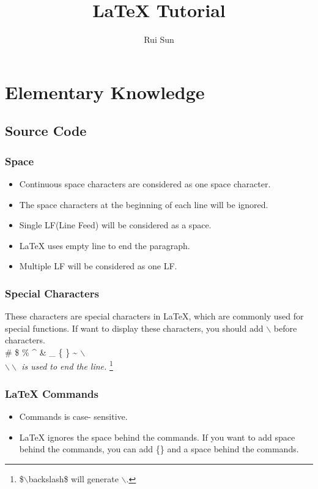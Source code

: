 \documentclass{article}
\author{Rui Sun}
\title{\LaTeX{} Tutorial}
\begin{document}
\maketitle
\tableofcontents
\section{Elementary Knowledge}
\subsection{Source Code}

\subsubsection{Space}
\begin{itemize}
    \item Continuous space characters
    are considered as one space character.
    \item The space characters at the beginning
    of each line will be ignored.
    \item Single LF(Line Feed) will be considered as
    a space.  
    \item \LaTeX{} uses empty line to end the paragraph.
    \item Multiple LF will be considered as one LF. 
\end{itemize}

\subsubsection{Special Characters}
These characters are special characters in \LaTeX{},
which are commonly used for special functions.
If want to display these characters, you should add $\backslash$ before characters. \\
\# \; \$ \; \% \; \^ \; \& \; \_ \; \{ \; \} \; 
\~ \; $\backslash$ \\
\emph{$\backslash\backslash$ is used to end the line.}
\footnote{\$$\backslash$backslash\$ will generate $\backslash$.}

\subsubsection{\LaTeX{} Commands}
\begin{itemize}
    \item Commands is case- sensitive.
    \item \LaTeX{} ignores the space behind the commands.
    If you want to add space behind the commands, you can 
    add \{\} and a space behind the commands. 
\end{itemize}
\end{document}
